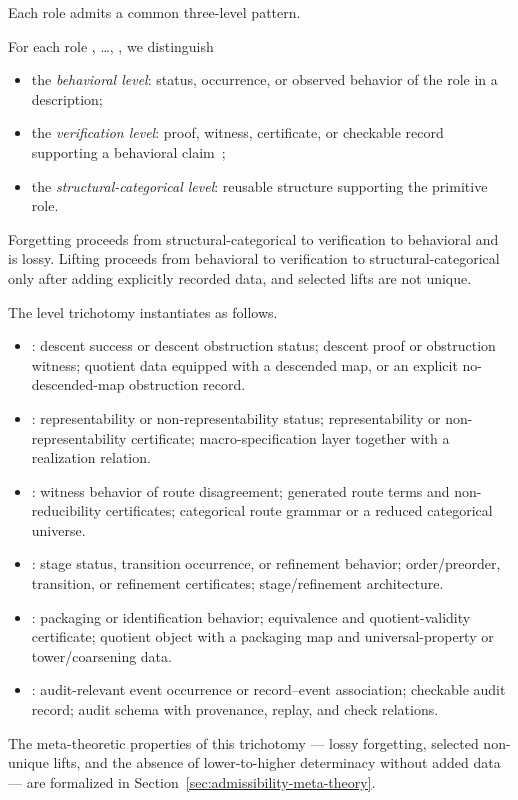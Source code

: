 Each role admits a common three-level pattern.

\begin{definition}\label{def:level-trichotomy}
For each role \Pone{}, \ldots, \Psix{}, we distinguish
\begin{itemize}[topsep=2pt,itemsep=1pt]
  \item the \emph{behavioral level}: status, occurrence, or observed
    behavior of the role in a description;
  \item the \emph{verification level}: proof, witness, certificate, or
    checkable record supporting a behavioral
    claim~\citep{MartinLof1984};
  \item the \emph{structural-categorical level}: reusable structure
    supporting the primitive role.
\end{itemize}
Forgetting proceeds from structural-categorical to verification to
behavioral and is lossy. Lifting proceeds from behavioral to
verification to structural-categorical only after adding explicitly
recorded data, and selected lifts are not unique.
\end{definition}

\begin{remark}\label{rem:per-primitive-levels}
The level trichotomy instantiates as follows.
\begin{itemize}[topsep=2pt,itemsep=1pt]
  \item \Pone{}: descent success or descent obstruction status; descent
    proof or obstruction witness; quotient data equipped with a descended
    map, or an explicit no-descended-map obstruction record.
  \item \Ptwo{}: representability or non-representability status;
    representability or non-representability certificate;
    macro-specification layer together with a realization relation.
  \item \Pthree{}: witness behavior of route disagreement; generated route
    terms and non-reducibility certificates; categorical route grammar or a
    reduced categorical universe.
  \item \Pfour{}: stage status, transition occurrence, or refinement
    behavior; order/preorder, transition, or refinement certificates;
    stage/refinement architecture.
  \item \Pfive{}: packaging or identification behavior; equivalence and
    quotient-validity certificate; quotient object with a packaging map
    and universal-property or tower/coarsening data.
  \item \Psix{}: audit-relevant event occurrence or record--event
    association; checkable audit record; audit schema with provenance,
    replay, and check relations.
\end{itemize}
The meta-theoretic properties of this trichotomy --- lossy forgetting,
selected non-unique lifts, and the absence of lower-to-higher determinacy
without added data --- are formalized in
Section~\ref{sec:admissibility-meta-theory}.
\end{remark}

